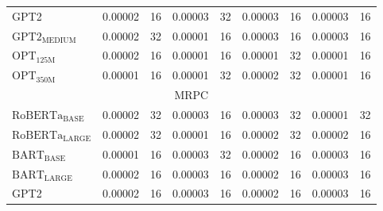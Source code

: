 {\begin{table*}[#1]
{\begin{tabular}{
    l@{\hskip 0.1in}
    c
    c@{\hskip 0.4in}
    c
    c@{\hskip 0.4in}
    c
    c@{\hskip 0.4in}
    c
    c
}
\\ 

GPT2 & 
0.00002&16 & 0.00003&32 & 0.00003&16 & 0.00003&16 \\


$\text{GPT2}_\text{MEDIUM}$ & 
0.00002&32 & 0.00001&16 & 0.00003&16 & 0.00003&16 \\

$\text{OPT}_\text{125M}$ & 
0.00002&16 & 0.00001&16 & 0.00001&32 & 0.00001&16 \\

$\text{OPT}_\text{350M}$ & 
0.00001&16 & 0.00001&32 & 0.00002&32 & 0.00001&16 \\

\midrule
\multicolumn{9}{c}{MRPC} \\
\midrule

$\text{RoBERTa}_\text{BASE}$ & 
0.00002 & %
32 & %


0.00003 & %
16 & %


0.00003 & %
32 & %


0.00001 & %
32 %
\\ 

$\text{RoBERTa}_\text{LARGE}$ & 
0.00002 & %
32 & %


0.00001 & %
16 & %


0.00002 & %
32 & %


0.00002 & %
16 %
\\ 

$\text{BART}_\text{BASE}$ & 
0.00001 & %
16 & %


0.00003 & %
32 & %


0.00002 & %
16 & %


0.00003 & %
16 %
\\ 

$\text{BART}_\text{LARGE}$ & 
0.00002 & %
16 & %


0.00003 & %
16 & %


0.00002 & %
16 & %


0.00003 & %
16 %
\\ 

GPT2 & 
0.00002&16 & 0.00003&16 & 0.00002&16 & 0.00003&16 \\


\end{tabular}}
\end{table*}}
